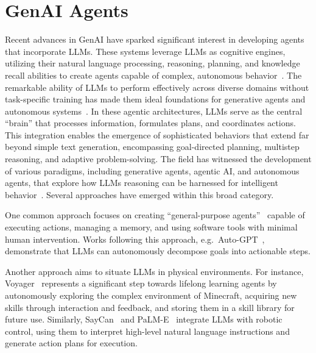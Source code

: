 \documentclass[12pt,a4paper,openright,twoside]{book}
\begin{document}
\section{GenAI Agents}\label{sec:genai-agents}

Recent advances in \ac{GenAI} have sparked significant interest in developing agents that incorporate \acp{LLM}.
%
These systems leverage \acp{LLM} as cognitive engines, utilizing their natural language processing, reasoning, planning, and knowledge recall abilities to create agents capable of complex, autonomous behavior~\cite{ParkOCMLB23, SumersYN024, WangMFZYZCTCLZWW24}. 
%
The remarkable ability of \acp{LLM} to perform effectively across diverse domains without task-specific training has made them ideal foundations for generative agents and autonomous systems~\cite{BubeckCEHLKLPZ23}.
%
In these agentic architectures, \acp{LLM} serve as the central ``brain'' that processes information, formulates plans, and coordinates actions. 
%
This integration enables the emergence of sophisticated behaviors that extend far beyond simple text generation, encompassing goal-directed planning, multistep reasoning, and adaptive problem-solving.
%
The field has witnessed the development of various paradigms, including generative agents, agentic AI, and autonomous agents, that explore how \acp{LLM} reasoning can be harnessed for intelligent behavior~\cite{Murugesan25a}.
%
Several approaches have emerged within this broad category.

One common approach focuses on creating ``general-purpose agents''~\cite{Murugesan25a} capable of executing actions, managing a memory, and using software tools with minimal human intervention.
%
Works following this approach, e.g.\ Auto-GPT~\cite{YangYH23}, demonstrate that \acp{LLM} can autonomously decompose goals into actionable steps.

Another approach aims to situate \acp{LLM} in physical environments.
%
For instance, Voyager~\cite{WangX0MXZFA24} represents a significant step towards lifelong learning agents by autonomously exploring the complex environment of Minecraft, acquiring new skills through interaction and feedback, and storing them in a skill library for future use.
%
Similarly, SayCan~\cite{HazraMR24} and PaLM-E~\cite{DriessXSLCIWTVY23} integrate \acp{LLM} with robotic control, using them to interpret high-level natural language instructions and generate action plans for execution.
\end{document}
